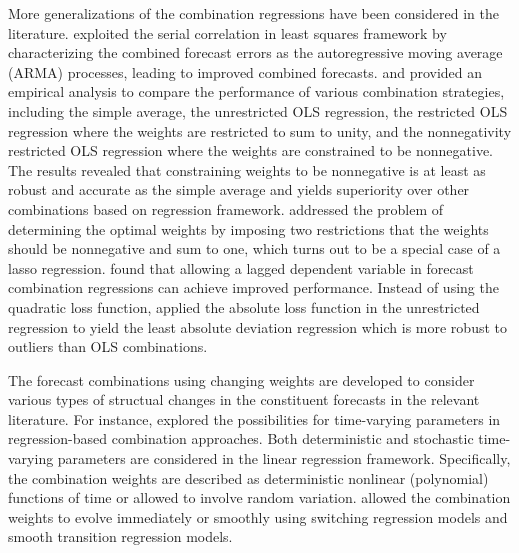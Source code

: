\documentclass[11pt]{article}
\begin{document}
More generalizations of the combination regressions have been considered in the literature. \cite{Diebold1988-sx} exploited the serial correlation in least squares framework by characterizing the combined forecast errors as the autoregressive moving average (ARMA) processes, leading to improved combined forecasts. \cite{Gunter1992-go} and \cite{Aksu1992-lb} provided an empirical analysis to compare the performance of various combination strategies, including the simple average, the unrestricted OLS regression, the restricted OLS regression where the weights are restricted to sum to unity, and the nonnegativity restricted OLS regression where the weights are constrained to be nonnegative. The results revealed that constraining weights to be nonnegative  is at least as robust and accurate as the simple average and yields superiority over other combinations based on regression framework. \cite{Conflitti2015-fq} addressed the problem of determining the optimal weights by imposing two restrictions that the weights should be nonnegative and sum to one, which turns out to be a special case of a lasso regression. \cite{Edward_Coulson1993-db} found that allowing a lagged dependent variable in forecast combination regressions can achieve improved performance. Instead of using the quadratic loss function, \cite{Nowotarski2014-ev} applied the absolute loss function in the unrestricted regression to yield the least absolute deviation regression which is more robust to outliers than OLS combinations.

The forecast combinations using changing weights are developed to consider various types of structual changes in the constituent forecasts in the relevant literature. For instance, \cite{Diebold1987-go} explored the possibilities for time-varying parameters in regression-based combination approaches. Both deterministic and stochastic time-varying parameters are considered in the linear regression framework. Specifically, the combination weights are described as deterministic nonlinear (polynomial) functions of time or allowed to involve random variation. \cite{Deutsch1994-ob} allowed the combination weights to evolve immediately or smoothly using switching regression models and smooth transition regression models.
\end{document}

